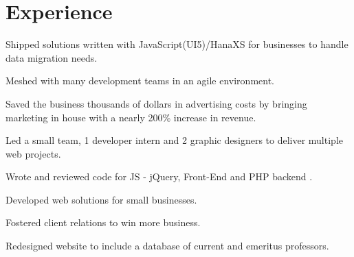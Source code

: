 \documentclass[]{deedy-resume-openfont}
\begin{document}
\hfill
\begin{minipage}[t]{0.66\textwidth} 


\section{Experience}
\vspace{\topsep} %
\vspace{\topsep} %
\begin{tightemize}
\item Shipped solutions written with JavaScript(UI5)/HanaXS for businesses to handle data migration needs.
\item Meshed with many development teams in an agile environment.
\end{tightemize}
\sectionsep

\vspace{\topsep} %
\begin{tightemize}
\item Saved the business thousands of dollars in advertising costs by bringing marketing in house with a nearly 200\% increase in revenue.
\item Led a small team, 1 developer intern and 2 graphic designers to deliver multiple web projects.
\item Wrote and reviewed code for JS - jQuery, Front-End and PHP backend .
\end{tightemize}
\sectionsep

\begin{tightemize}
\item Developed web solutions for small businesses.
\item Fostered client relations to win more business.
\end{tightemize}
\sectionsep

\begin{tightemize}
\item Redesigned website to include a database of current and emeritus professors.
\end{tightemize}
\sectionsep


\end{minipage}
\end{document}
